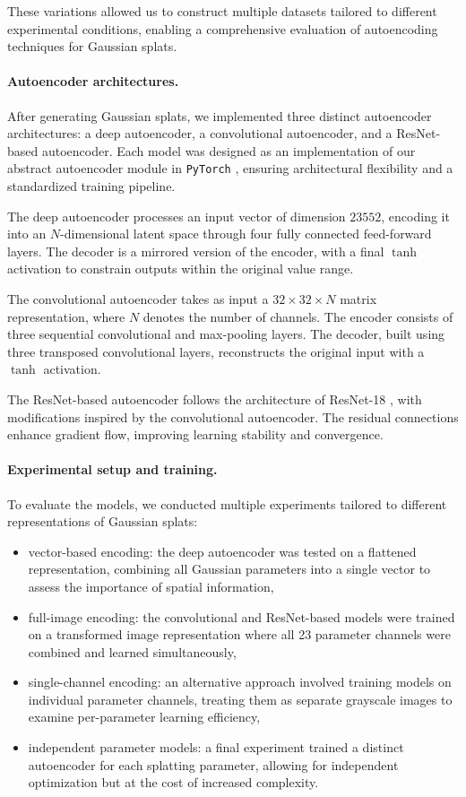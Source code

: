 These variations allowed us to construct multiple datasets tailored to different experimental conditions, enabling a comprehensive evaluation of autoencoding techniques for Gaussian splats.

\paragraph{Autoencoder architectures.}
After generating Gaussian splats, we implemented three distinct autoencoder architectures: a deep autoencoder, a convolutional autoencoder, and a ResNet-based autoencoder. Each model was designed as an implementation of our abstract autoencoder module in \texttt{PyTorch} \cite{paszke2019pytorchai}, ensuring architectural flexibility and a standardized training pipeline.

The deep autoencoder processes an input vector of dimension $23552$, encoding it into an $N$-dimensional latent space through four fully connected feed-forward layers. The decoder is a mirrored version of the encoder, with a final $\tanh$ activation to constrain outputs within the original value range.

The convolutional autoencoder takes as input a $32 \times 32 \times N$ matrix representation, where $N$ denotes the number of channels. The encoder consists of three sequential convolutional and max-pooling layers. The decoder, built using three transposed convolutional layers, reconstructs the original input with a $\tanh$ activation.

The ResNet-based autoencoder follows the architecture of ResNet-18 \cite{he2015deeprl}, with modifications inspired by the convolutional autoencoder. The residual connections enhance gradient flow, improving learning stability and convergence.

\paragraph{Experimental setup and training.}
To evaluate the models, we conducted multiple experiments tailored to different representations of Gaussian splats:

\begin{itemize}
\item vector-based encoding: the deep autoencoder was tested on a flattened representation, combining all Gaussian parameters into a single vector to assess the importance of spatial information,
\item full-image encoding: the convolutional and ResNet-based models were trained on a transformed image representation where all 23 parameter channels were combined and learned simultaneously,
\item single-channel encoding: an alternative approach involved training models on individual parameter channels, treating them as separate grayscale images to examine per-parameter learning efficiency,
\item independent parameter models: a final experiment trained a distinct autoencoder for each splatting parameter, allowing for independent optimization but at the cost of increased complexity.
\end{itemize}

